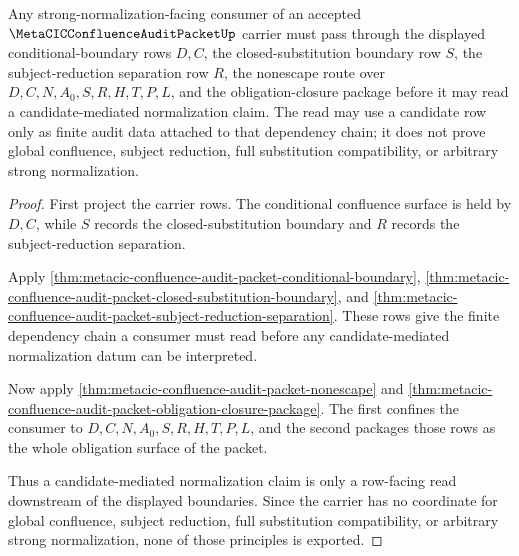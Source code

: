 \begin{theorem}\label{thm:metacic-confluence-audit-packet-candidate-mediated-sn-boundary}
Any strong-normalization-facing consumer of an accepted $\MetaCICConfluenceAuditPacketUp$ carrier must pass through the displayed conditional-boundary rows $D,C$, the closed-substitution boundary row $S$, the subject-reduction separation row $R$, the nonescape route over $D,C,N,A_0,S,R,H,T,P,L$, and the obligation-closure package before it may read a candidate-mediated normalization claim. The read may use a candidate row only as finite audit data attached to that dependency chain; it does not prove global confluence, subject reduction, full substitution compatibility, or arbitrary strong normalization.
\end{theorem}
\begin{proof}
First project the carrier rows. The conditional confluence surface is held by $D,C$, while $S$ records the closed-substitution boundary and $R$ records the subject-reduction separation.

Apply \autoref{thm:metacic-confluence-audit-packet-conditional-boundary}, \autoref{thm:metacic-confluence-audit-packet-closed-substitution-boundary}, and \autoref{thm:metacic-confluence-audit-packet-subject-reduction-separation}. These rows give the finite dependency chain a consumer must read before any candidate-mediated normalization datum can be interpreted.

Now apply \autoref{thm:metacic-confluence-audit-packet-nonescape} and \autoref{thm:metacic-confluence-audit-packet-obligation-closure-package}. The first confines the consumer to $D,C,N,A_0,S,R,H,T,P,L$, and the second packages those rows as the whole obligation surface of the packet.

Thus a candidate-mediated normalization claim is only a row-facing read downstream of the displayed boundaries. Since the carrier has no coordinate for global confluence, subject reduction, full substitution compatibility, or arbitrary strong normalization, none of those principles is exported.
\end{proof}

